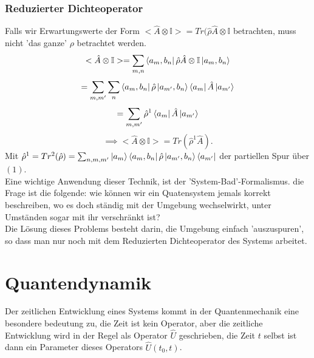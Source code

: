 \documentclass{report}
\begin{document}
\subsection{Reduzierter Dichteoperator}
Falls wir Erwartungswerte der Form $<\hat{A} \otimes \mathbb{I}> = Tr(\hat{\rho} \hat{A} \otimes \mathbb{I}$ betrachten, muss nicht 'das ganze' $\rho$ betrachtet werden. \[
	<\hat{A} \otimes \mathbb{I}> = \sum_{m,n} \bra{a_m, b_n} \hat{\rho} \hat{A} \otimes \mathbb{I} \ket{a_m, b_n} 
\] \[
= \sum_{m, m'} \sum_{n} \bra{a_m, b_n} \hat{\rho} \ket{a_{m'}, b_n} \bra{a_m} \hat{A} \ket{a_{m'}}  
\] \[
= \sum_{m, m'} \hat{\rho}^1 \bra{a_m} \hat{A} \ket{a_{m'}} 
\] \[
\implies <\hat{A} \otimes \mathbb{I}> = Tr(\hat{\rho}^1\hat{A})
.\]    Mit $\hat{\rho}^1 = Tr^2(\hat{\rho}) = \sum_{n, m, m'} \ket{a_m} \bra{a_m, b_n} \hat{\rho} \ket{a_{m'}, b_n} \bra{a_{m'}} $ der partiellen Spur über $(1)$. \\
Eine wichtige Anwendung dieser Technik, ist der 'System-Bad'-Formalismus. die Frage ist die folgende: wie können wir ein Quatensystem jemals korrekt beschreiben, wo es doch ständig mit der Umgebung wechselwirkt, unter Umständen sogar mit ihr verschränkt ist? \\
Die Lösung dieses Problems besteht darin, die Umgebung einfach 'auszuspuren', so dass man nur noch mit dem Reduzierten Dichteoperator des Systems arbeitet.
\chapter{Quantendynamik}
Der zeitlichen Entwicklung eines Systems kommt in der Quantenmechanik eine besondere bedeutung zu, die Zeit ist kein Operator, aber die zeitliche Entwicklung wird in der Regel als Operator $\hat{U}$ geschrieben, die Zeit $t$ selbst ist dann ein Parameter dieses Operators $\hat{U}(t_0, t)$.
\end{document}
